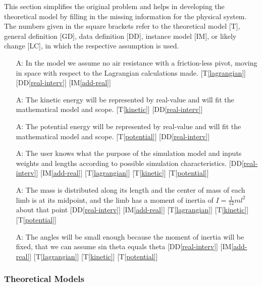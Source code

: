 \documentclass[12pt, titlepage]{article}
\newcommand{\ddref}[1]{DD\ref{#1}}
\newcommand{\tref}[1]{T\ref{#1}}
\newcounter{assumpnum} %
\newcommand{\iref}[1]{IM\ref{#1}}
\begin{document}
This section simplifies the original problem and helps in developing the
theoretical model by filling in the missing information for the physical
system. The numbers given in the square brackets refer to the theoretical model
[T], general definition [GD], data definition [DD], instance model [IM], or
likely change [LC], in which the respective assumption is used.

\begin{itemize}
\item[A\refstepcounter{assumpnum}\theassumpnum \label{A:equation}:]
In the model we assume no air resistance with a friction-less pivot, moving in
space with respect to the Lagrangian calculations made. [\tref{lagrangian}]
[\ddref{real-interv}] [\iref{add-real}]
\item[A\refstepcounter{assumpnum}\theassumpnum \label{A:kinetic}:]
The kinetic energy will be represented by real-value and will fit the 
mathematical model and scope. [\tref{kinetic}] [\ddref{real-interv}]
\item[A\refstepcounter{assumpnum}\theassumpnum \label{A:poten}:]
The potential energy will be represented by real-value and will fit the 
mathematical model and scope. [\tref{potential}] [\ddref{real-interv}]
\item[A\refstepcounter{assumpnum}\theassumpnum \label{A:init-user}:]
The user knows what the purpose of the simulation model and inputs weights and 
lengths according to possible simulation characteristics. 
[\ddref{real-interv}] [\iref{add-real}] [\tref{lagrangian}] [\tref{kinetic}]
[\tref{potential}]
\item[A\refstepcounter{assumpnum}\theassumpnum \label{A:centered}:]
The mass is distributed along its length and the center 
of mass of each limb is at its midpoint, and the limb has a moment of inertia 
of $I = \frac{1}{12}ml^2$ about that point
[\ddref{real-interv}] [\iref{add-real}] [\tref{lagrangian}] [\tref{kinetic}]
[\tref{potential}]
\item[A\refstepcounter{assumpnum}\theassumpnum \label{A:init-angle}:]
The angles will be small enough because the moment of inertia will be fixed,
that we can assume sin theta equals theta
[\ddref{real-interv}] [\iref{add-real}] [\tref{lagrangian}] [\tref{kinetic}]
[\tref{potential}]
\end{itemize}

\newpage

\subsubsection{Theoretical Models}\label{sec_theoretical}
\end{document}
